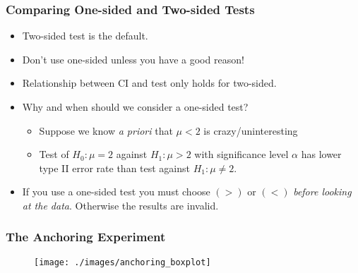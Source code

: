 \begin{frame}
  \frametitle{Comparing One-sided and Two-sided Tests}

  \begin{itemize}
    \item Two-sided test is the default. \pause
    \item Don't use one-sided unless you have a good reason! \pause
    \item Relationship between CI and test \alert{only holds for two-sided}.\pause
    \item Why and when should we consider a one-sided test?\pause
      \begin{itemize}
        \item Suppose we know \emph{a priori} that $\mu < 2$ is crazy/uninteresting\pause
        \item Test of $H_0\colon \mu=2$ against $H_1\colon \mu>2$ with significance level $\alpha$ has \alert{lower type II error rate} than test against $H_1\colon \mu\neq 2$. \pause
      \end{itemize}
    \item If you use a one-sided test you \alert{must choose $(>)$ or $(<)$ \emph{before looking at the data}}. Otherwise the results are invalid.
  \end{itemize}
\end{frame}
%
%
%
%
%
\begin{frame}
\frametitle{The Anchoring Experiment}
\begin{figure}
\centering
\texttt{[image: ./images/anchoring\_boxplot]}
\end{figure}
\end{frame}
